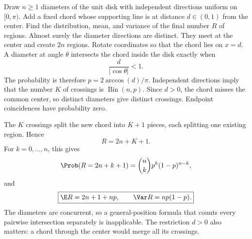 Draw $n\ge1$ diameters of the unit disk with independent directions uniform on $[0,\pi)$. Add a fixed chord whose supporting line is at distance $d\in(0,1)$ from the center. Find the distribution, mean, and variance of the final number $R$ of regions.
\solution Almost surely the diameter directions are distinct. They meet at the center and create $2n$ regions. Rotate coordinates so that the chord lies on $x=d$. A diameter at angle $\theta$ intersects the chord inside the disk exactly when
\[
\frac d{|\cos\theta|}<1.
\]
The probability is therefore $p=2\arccos(d)/\pi$. Independent directions imply that the number $K$ of crossings is $\operatorname{Bin}(n,p)$. Since $d>0$, the chord misses the common center, so distinct diameters give distinct crossings. Endpoint coincidences have probability zero.

The $K$ crossings split the new chord into $K+1$ pieces, each splitting one existing region. Hence
\[
\boxed{R=2n+K+1.}
\]
For $k=0,\ldots,n$, this gives
\[
\Prob(R=2n+k+1)=\binom nkp^k(1-p)^{n-k},
\]
and
\[
\boxed{\E R=2n+1+np,\qquad \Var R=np(1-p).}
\]
\pitfall The diameters are concurrent, so a general-position formula that counts every pairwise intersection separately is inapplicable. The restriction $d>0$ also matters: a chord through the center would merge all its crossings.
